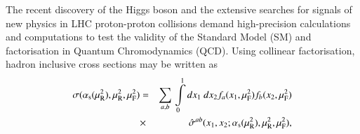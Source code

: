 The recent discovery of the Higgs boson \cite{Aad:2012tfa,Chatrchyan:2012ufa} 
and the extensive searches
for signals of new physics in LHC proton-proton collisions
demand high-precision calculations and computations to test the validity of the Standard Model (SM)
and factorisation in Quantum Chromodynamics (QCD).
Using collinear factorisation, hadron inclusive cross sections may be written as
%
\begin{eqnarray}
\small
%
\sigma(\as(\mur^2),\mur^2,\muf^2)&=& \sum\limits_{a,b}\,  \int\limits_{0}\limits^{1} dx_1\ dx_2  f_a(x_1,\muf^2) f_b(x_2,\muf^2) \nonumber \\ 
&\times&  \, \hat{\sigma}^{ab}(x_1,x_2;\as(\mur^2),\mur^2,\muf^2),
\label{eq:fact}
\end{eqnarray}
